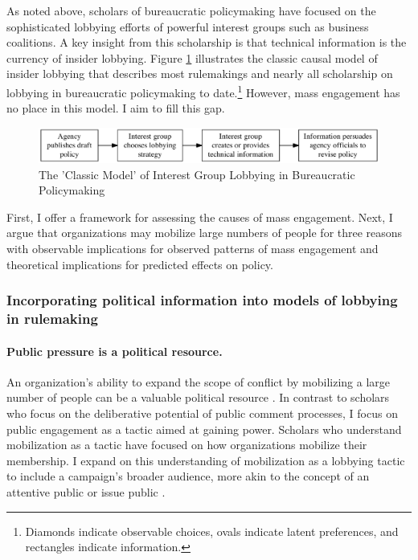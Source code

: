 \documentclass[
      12pt,
        ]{article}
\begin{document}
As noted above, scholars of bureaucratic policymaking have focused on
the sophisticated lobbying efforts of powerful interest groups such as
business coalitions. A key insight from this scholarship is that
technical information is the currency of insider lobbying. Figure
\ref{fig:causal-classic} illustrates the classic causal
model of insider lobbying that describes most rulemakings and nearly all
scholarship on lobbying in bureaucratic policymaking to date.\footnote{Diamonds indicate observable choices, ovals indicate latent preferences, and rectangles indicate information.}
However, mass engagement has no place in this model. I aim to fill this
gap.

\begin{figure}

{\centering \includegraphics[width=6.5in]{../Figs/causal-classic} 

}

\caption{The 'Classic Model' of Interest Group Lobbying in Bureaucratic Policymaking}\label{fig:causal-classic}
\end{figure}

First, I offer a framework for assessing the causes of mass engagement.
Next, I argue that organizations may mobilize large numbers of people
for three reasons with observable implications for observed patterns of
mass engagement and theoretical implications for predicted effects on
policy.

\hypertarget{incorporating-political-information-into-models-of-lobbying-in-rulemaking}{%
\subsubsection{Incorporating political information into models of lobbying in rulemaking}\label{incorporating-political-information-into-models-of-lobbying-in-rulemaking}}

\hypertarget{public-pressure-is-a-political-resource.}{%
\paragraph{Public pressure is a political resource.}\label{public-pressure-is-a-political-resource.}}

An organization's ability to expand the scope of conflict by mobilizing
a large number of people can be a valuable political resource \citep{Schattschneider1975}. In contrast to scholars who focus on the deliberative
potential of public comment processes, I focus on public engagement as a
tactic aimed at gaining power. Scholars who understand mobilization
as a tactic \citep{Furlong1997, Kerwin2011} have focused on how
organizations mobilize their membership. I expand on this understanding of mobilization as a lobbying tactic to include a campaign's broader audience, more akin to the concept of
an attentive public \citep{Key1961} or issue public \citep{Converse1964}.
\end{document}
